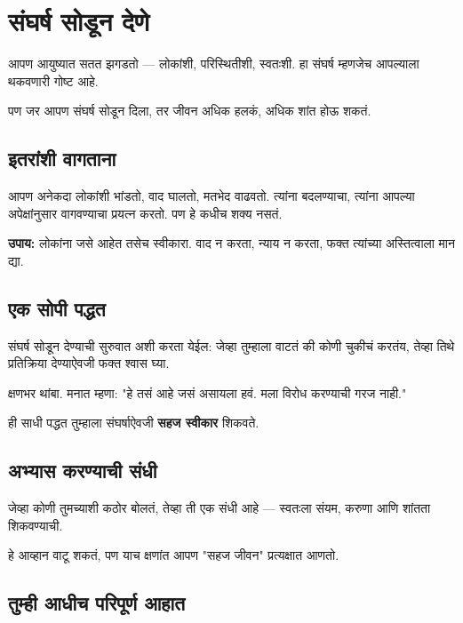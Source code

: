 \chapter{संघर्ष सोडून देणे}

आपण आयुष्यात सतत झगडतो —  
लोकांशी, परिस्थितीशी, स्वतःशी.  
हा संघर्ष म्हणजेच आपल्याला थकवणारी गोष्ट आहे.  

पण जर आपण संघर्ष सोडून दिला,  
तर जीवन अधिक हलकं, अधिक शांत होऊ शकतं.  



\section*{इतरांशी वागताना}

आपण अनेकदा लोकांशी भांडतो, वाद घालतो, मतभेद वाढवतो.  
त्यांना बदलण्याचा, त्यांना आपल्या अपेक्षांनुसार वागवण्याचा प्रयत्न करतो.  
पण हे कधीच शक्य नसतं.  

\textbf{उपाय:}  
लोकांना जसे आहेत तसेच स्वीकारा.  
वाद न करता, न्याय न करता, फक्त त्यांच्या अस्तित्वाला मान द्या.  



\section*{एक सोपी पद्धत}

संघर्ष सोडून देण्याची सुरुवात अशी करता येईल:  
जेव्हा तुम्हाला वाटतं की कोणी चुकीचं करतंय,  
तेव्हा तिथे प्रतिक्रिया देण्याऐवजी फक्त श्वास घ्या.  

क्षणभर थांबा.  
मनात म्हणा: "हे तसं आहे जसं असायला हवं. मला विरोध करण्याची गरज नाही."  

ही साधी पद्धत तुम्हाला संघर्षाऐवजी \textbf{सहज स्वीकार} शिकवते.  



\section*{अभ्यास करण्याची संधी}

जेव्हा कोणी तुमच्याशी कठोर बोलतं,  
तेव्हा ती एक संधी आहे — स्वतःला संयम, करुणा आणि शांतता शिकवण्याची.  

हे आव्हान वाटू शकतं,  
पण याच क्षणांत आपण "सहज जीवन" प्रत्यक्षात आणतो.  



\section*{तुम्ही आधीच परिपूर्ण आहात}

